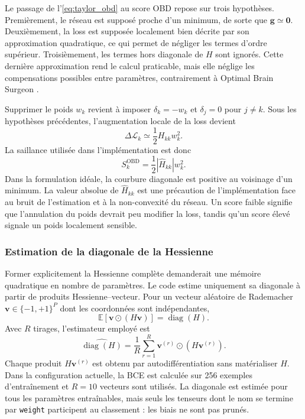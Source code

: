 Le passage de l'\autoref{eq:taylor_obd} au score OBD repose sur trois
hypothèses. Premièrement, le réseau est supposé proche d'un minimum, de sorte
que $\boldsymbol{g}\simeq\boldsymbol{0}$. Deuxièmement, la loss est supposée
localement bien décrite par son approximation quadratique, ce qui permet de
négliger les termes d'ordre supérieur. Troisièmement, les termes hors diagonale
de $H$ sont ignorés. Cette dernière approximation rend le calcul praticable,
mais elle néglige les compensations possibles entre paramètres, contrairement à
Optimal Brain Surgeon \cite{hassibi1993obs}.

Supprimer le poids $w_k$ revient à imposer
$\delta_k=-w_k$ et $\delta_j=0$ pour $j\neq k$. Sous les hypothèses
précédentes, l'augmentation locale de la loss devient
\begin{equation}
    \Delta\mathcal{L}_k
    \simeq \frac{1}{2}H_{kk}w_k^2.
\end{equation}
La saillance utilisée dans l'implémentation est donc
\begin{equation}
    S_k^{\mathrm{OBD}}
    =\frac{1}{2}\left|\widehat{H}_{kk}\right|w_k^2.
    \label{eq:score_obd}
\end{equation}
Dans la formulation idéale, la courbure diagonale est positive au voisinage
d'un minimum. La valeur absolue de $\widehat{H}_{kk}$ est une précaution de
l'implémentation face au bruit de l'estimation et à la non-convexité du réseau.
Un score faible signifie que l'annulation du poids devrait peu modifier la
loss, tandis qu'un score élevé signale un poids localement sensible.

\subsubsection{Estimation de la diagonale de la Hessienne}

Former explicitement la Hessienne complète demanderait une mémoire quadratique
en nombre de paramètres. Le code estime uniquement sa diagonale à partir de
produits Hessienne--vecteur. Pour un vecteur aléatoire de Rademacher
$\boldsymbol{v}\in\{-1,+1\}^{P}$ dont les coordonnées sont indépendantes,
\begin{equation}
    \mathbb{E}\!\left[
        \boldsymbol{v}\odot(H\boldsymbol{v})
    \right]
    =\operatorname{diag}(H).
\end{equation}
Avec $R$ tirages, l'estimateur employé est
\begin{equation}
    \widehat{\operatorname{diag}(H)}
    =\frac{1}{R}\sum_{r=1}^{R}
      \boldsymbol{v}^{(r)}\odot
      \left(H\boldsymbol{v}^{(r)}\right).
    \label{eq:hutchinson_diagonale}
\end{equation}
Chaque produit $H\boldsymbol{v}^{(r)}$ est obtenu par autodifférentiation sans
matérialiser $H$. Dans la configuration actuelle, la BCE est calculée sur 256
exemples d'entraînement et $R=10$ vecteurs sont utilisés. La diagonale est
estimée pour tous les paramètres entraînables, mais seuls les tenseurs dont le
nom se termine par \texttt{weight} participent au classement : les biais ne
sont pas prunés.

